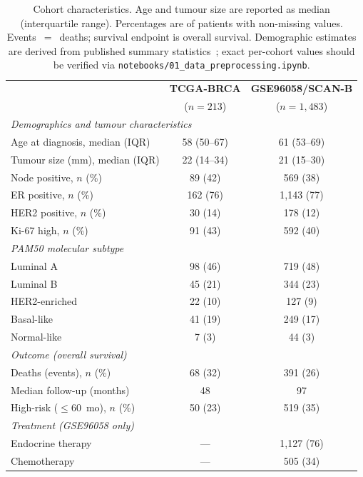 \documentclass[review,12pt]{elsarticle}
\begin{document}
\begin{table}[!ht]
\centering
\caption{Cohort characteristics.  Age and tumour size are reported as
  median (interquartile range).  Percentages are of patients with
  non-missing values.  Events~$=$~deaths; survival endpoint is
  overall survival.  Demographic estimates are derived from published
  summary statistics~\citep{tcga2012,saal2015,brueffer2018}; exact
  per-cohort values should be verified via
  \texttt{notebooks/01\_data\_preprocessing.ipynb}.}
\label{tab:cohorts}
\footnotesize
\begin{tabular}{lcc}
\toprule
& \textbf{TCGA-BRCA} & \textbf{GSE96058/SCAN-B} \\
& ($n = 213$) & ($n = 1{,}483$) \\
\midrule
\multicolumn{3}{l}{\textit{Demographics and tumour characteristics}} \\
Age at diagnosis, median (IQR) & 58 (50--67) & 61 (53--69) \\
Tumour size (mm), median (IQR) & 22 (14--34) & 21 (15--30) \\
Node positive, $n$ (\%)        & 89 (42)      & 569 (38) \\
ER positive, $n$ (\%)          & 162 (76)     & 1{,}143 (77) \\
HER2 positive, $n$ (\%)        & 30 (14)      & 178 (12) \\
Ki-67 high, $n$ (\%)           & 91 (43)      & 592 (40) \\
\multicolumn{3}{l}{\textit{PAM50 molecular subtype}} \\
Luminal A                       & 98 (46)      & 719 (48) \\
Luminal B                       & 45 (21)      & 344 (23) \\
HER2-enriched                   & 22 (10)      & 127 (9) \\
Basal-like                      & 41 (19)      & 249 (17) \\
Normal-like                     & 7 (3)        & 44 (3) \\
\multicolumn{3}{l}{\textit{Outcome (overall survival)}} \\
Deaths (events), $n$ (\%)      & 68 (32)      & 391 (26) \\
Median follow-up (months)       & 48           & 97 \\
High-risk ($\le$60~mo), $n$ (\%) & 50 (23)   & 519 (35) \\
\multicolumn{3}{l}{\textit{Treatment (GSE96058 only)}} \\
Endocrine therapy               & ---          & 1{,}127 (76) \\
Chemotherapy                    & ---          & 505 (34) \\
\bottomrule
\end{tabular}
\end{table}
\end{document}
